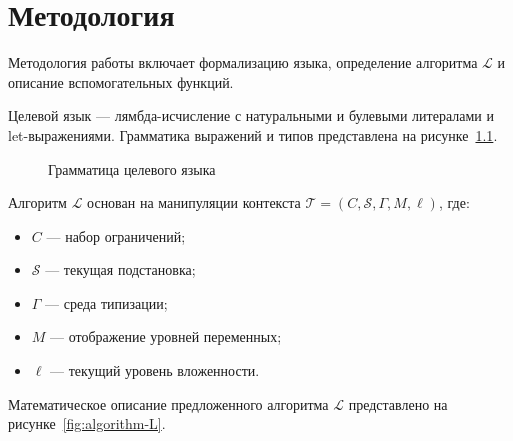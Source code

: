 \chapter{Методология}
\label{chap:met}

Методология работы включает формализацию языка, определение алгоритма $\mathcal{L}$ и описание вспомогательных функций.

Целевой язык — лямбда-исчисление с натуральными и булевыми литералами и let-выражениями. Грамматика выражений и типов представлена на рисунке~\ref{fig:object-language-grammar}.

\begin{figure}[H]
  \caption{Грамматица целевого языка}
  \label{fig:object-language-grammar}
\end{figure}

Алгоритм $\mathcal{L}$ основан на манипуляции контекста $\mathcal{T} = (C,\mathcal{S},\Gamma,M,\ell)$, где:
\begin{itemize}
  \item $C$ — набор ограничений;
  \item $\mathcal{S}$ — текущая подстановка;
  \item $\Gamma$ — среда типизации;
  \item $M$ — отображение уровней переменных;
  \item $\ell$ — текущий уровень вложенности.
\end{itemize}

Математическое описание предложенного алгоритма $\mathcal{L}$ представлено на рисунке~\ref{fig:algorithm-L}.


